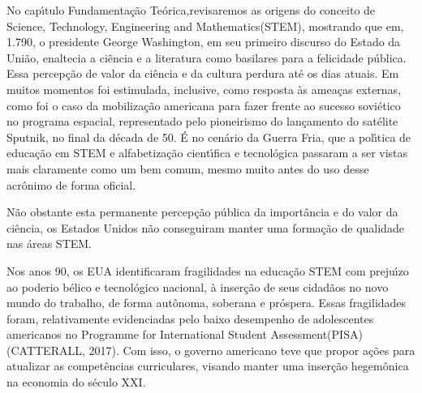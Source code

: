 \documentclass[
12pt,		%
openright,	%
twoside,  %
a4paper,			%
chapter=TITLE,		%
english,			%
french,				%
spanish,			%
brazil				%
]{USPSC-classe/USPSC}
\begin{document}
No cap\'{\i}tulo \textquotedbl Fundamenta\c{c}\~ao Te\'orica,\textquotedbl  revisaremos as origens do conceito de \textquotedbl Science, Technology, Engineering and Mathematics\textquotedbl  (STEM), mostrando que em, 1.790, o presidente George Washington, em seu primeiro discurso do \textquotedbl Estado da Uni\~ao\textquotedbl , enaltecia a ci\^encia e a literatura como  basilares para a \textquotedbl felicidade p\'ublica. Essa percep\c{c}\~ao de valor da ci\^encia e da cultura perdura at\'e os dias atuais. Em muitos momentos foi estimulada, inclusive, como resposta \`as amea\c{c}as externas, como foi o caso da mobiliza\c{c}\~ao americana para fazer frente ao sucesso sovi\'etico no programa espacial, representado pelo pioneirismo do lan\c{c}amento do sat\'elite Sputnik, no final da d\'ecada de 50. \'E no cen\'ario da Guerra Fria, que a pol\'{\i}tica de educa\c{c}\~ao em STEM e alfabetiza\c{c}\~ao cient\'{\i}fica e tecnol\'ogica passaram a ser vistas mais claramente como um bem comum, mesmo muito antes do uso desse acr\^onimo de forma oficial.

















N\~ao obstante esta permanente percep\c{c}\~ao p\'ublica da import\^ancia e do valor da ci\^encia, os Estados Unidos n\~ao conseguiram manter uma forma\c{c}\~ao de qualidade nas \'areas STEM.

















Nos anos 90, os EUA identificaram fragilidades na educa\c{c}\~ao STEM com preju\'{\i}zo ao \textquotedbl poderio b\'elico e tecnol\'ogico nacional\textquotedbl , \`a inser\c{c}\~ao de seus cidad\~aos no novo mundo do trabalho, de forma aut\^onoma, soberana  e pr\'ospera. Essas fragilidades foram, relativamente evidenciadas pelo baixo desempenho de adolescentes americanos no \textquotedbl Programme for International Student Assessment\textquotedbl  (PISA)  (CATTERALL, 2017). Com isso, o governo americano teve que propor a\c{c}\~oes para atualizar as compet\^encias curriculares, visando manter uma inser\c{c}\~ao hegem\^onica na economia do s\'eculo XXI.
\end{document}
